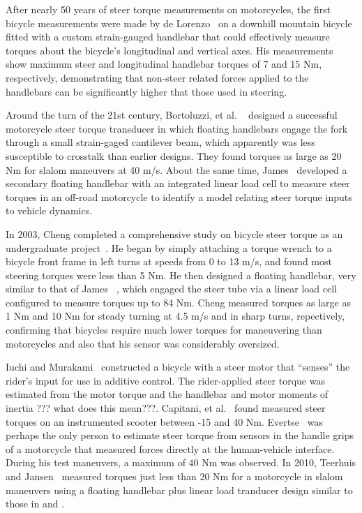 \documentclass[10pt]{article}
\begin{document}
After nearly 50 years of steer torque measurements on motorcycles, the first
bicycle measurements were made by de Lorenzo~\cite{Lorenzo1997} on a downhill
mountain bicycle fitted with a custom strain-gauged handlebar that could
effectively measure torques about the bicycle's longitudinal and vertical axes.
His measurements show maximum steer and longitudinal handlebar torques of 7 and
15 Nm, respectively, demonstrating that non-steer related forces applied to the
handlebars can be significantly higher that those used in steering.

Around the turn of the 21st century, Bortoluzzi, et al. ~\cite{Bortoluzzi2000}
designed a successful motorcycle steer torque transducer in which floating
handlebars engage the fork through a small strain-gaged cantilever beam, which
apparently was less susceptible to crosstalk than earlier designs. They found
torques as large as 20 Nm for slalom maneuvers at 40 m/s. About the same time,
James~\cite{James2002} developed a secondary floating handlebar with an
integrated linear load cell to measure steer torques in an off-road motorcycle
to identify a model relating steer torque inputs to vehicle dynamics.

In 2003, Cheng completed a comprehensive study on bicycle steer torque as an
undergraduate project~\cite{Cheng2003}. He began by simply attaching a torque
wrench to a bicycle front frame in left turns at speeds from 0 to 13 m/s, and
found most steering torques were less than 5 Nm. He then designed a floating
handlebar, very similar to that of James~\cite{James2002} , which engaged the
steer tube via a linear load cell configured to measure torques up to 84 Nm.
Cheng measured torques as large as 1 Nm and 10 Nm for steady turning at 4.5 m/s
and in sharp turns, repectively, confirming that bicycles require much lower
torques for maneuvering than motorcycles and also that his sensor was
considerably oversized.

Iuchi and Murakami~\cite{Iuchi2006} constructed a bicycle with a steer motor
that ``senses'' the rider's input for use in additive control. The
rider-applied steer torque was estimated from the motor torque and the
handlebar and motor moments of inertia ??? what does this mean???. Capitani, et
al.~\cite{Capitani2006} found measured steer torques on an instrumented scooter
between -15 and 40 Nm. Evertse~\cite{Evertse2010} was perhaps the only person
to estimate steer torque from sensors in the handle grips of a motorcycle that
measured forces directly at the human-vehicle interface. During his test
maneuvers, a maximum of 40 Nm was observed. In 2010, Teerhuis and
Jansen~\cite{Teerhuis2010}  measured torques just less than 20 Nm for a
motorcycle in slalom maneuvers using a floating handlebar plus linear load
tranducer design similar to those in \cite{James2002} and \cite{Cheng2003}.
\end{document}
